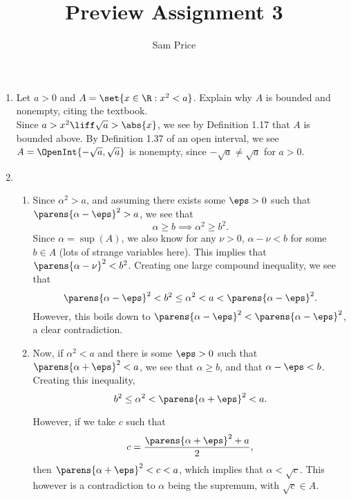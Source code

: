 \documentclass{article}
\author{Sam Price}
\date{}
\title{Preview Assignment 3}
\begin{document}
\maketitle

\begin{enumerate}

  \item Let $a > 0$ and $A = \set{x \in \R : x^{2} < a}$. Explain why $A$ is bounded and nonempty, citing the textbook.\\
        Since $a > x^{2} \liff \sqrt{a} > \abs{x}$, we see by Definition 1.17 that $A$ is bounded above.
        By Definition 1.37 of an open interval, we see $A = \OpenInt{-\sqrt{a}, \sqrt{a}}$ is nonempty,
        since $-\sqrt{a} \ne \sqrt{a}$ for $a > 0$.

  \item \begin{enumerate}
          \item Since $\alpha^{2} > a$, and assuming there exists some $\eps > 0$ such that $\parens{\alpha - \eps}^{2} > a$, we see that
                \begin{equation*}
                  \alpha \ge b \implies \alpha^{2} \ge b^{2}.
                \end{equation*}
                Since $\alpha = \sup(A)$, we also know for any $\nu > 0$, $\alpha - \nu < b$ for some $b \in A$ (lots of strange variables here).
                This implies that $\parens{\alpha - \nu}^{2} < b^{2}$.
                Creating one large compound inequality, we see that
                \begin{equation*}
                  \parens{\alpha - \eps}^{2} < b^{2} \le \alpha^{2} < a < \parens{\alpha - \eps}^{2}.
                \end{equation*}
                However, this boils down to $\parens{\alpha - \eps}^{2} < \parens{\alpha - \eps}^{2}$, a clear contradiction.

          \item Now, if $\alpha^{2} < a$ and there is some $\eps > 0$ such that $\parens{\alpha + \eps}^{2} < a$,
                we see that $\alpha \ge b$, and that $\alpha - \eps < b$. Creating this inequality,
                \begin{equation*}
                  b^{2} \le \alpha^{2} < \parens{\alpha + \eps}^{2} < a.
                \end{equation*}

                However, if we take $c$ such that
                \begin{equation*}
                  c = \frac{\parens{\alpha + \eps}^{2} + a}{2},
                \end{equation*}
                then $\parens{\alpha + \eps}^{2} < c < a$, which implies that $\alpha < \sqrt{c}$.
                This however is a contradiction to $\alpha$ being the supremum, with $\sqrt{c} \in A$.


\end{enumerate}
\end{enumerate}
\end{document}
